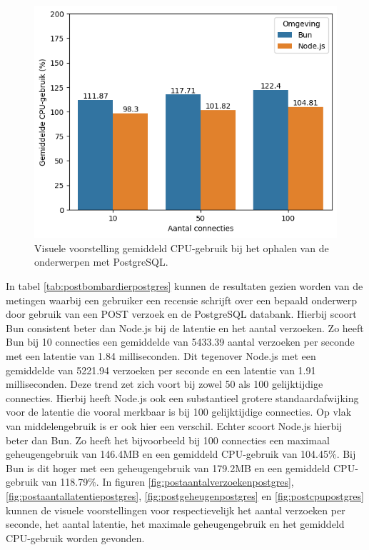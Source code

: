   \begin{figure}[H]
    \centering
    \includegraphics[width=0.7\columnwidth]{graphics/GetPostgresCpu.png}
    \caption[CPU-gebruik GET verzoek met PostgreSQL]{\label{fig:getcpupostgres}Visuele voorstelling gemiddeld CPU-gebruik bij het ophalen van de onderwerpen met PostgreSQL.}
  \end{figure}

In tabel \ref{tab:postbombardierpostgres} kunnen de resultaten gezien worden van de metingen waarbij 
een gebruiker een recensie schrijft over een bepaald onderwerp door gebruik van een POST verzoek en de PostgreSQL databank.
Hierbij scoort Bun consistent beter dan Node.js bij de latentie en het aantal verzoeken.
Zo heeft Bun bij 10 connecties een gemiddelde van 5433.39 aantal verzoeken per seconde met een latentie van 1.84 milliseconden. 
Dit tegenover Node.js met een gemiddelde van 5221.94 verzoeken per seconde en een latentie van 1.91 milliseconden.
Deze trend zet zich voort bij zowel 50 als 100 gelijktijdige connecties.
Hierbij heeft Node.js ook een substantieel grotere standaardafwijking voor de latentie die vooral merkbaar is bij 100 gelijktijdige connecties.
Op vlak van middelengebruik is er ook hier een verschil. Echter scoort Node.js hierbij beter dan Bun.
Zo heeft het bijvoorbeeld bij 100 connecties een maximaal geheugengebruik van 146.4MB en een gemiddeld CPU-gebruik van 104.45\%.
Bij Bun is dit hoger met een geheugengebruik van 179.2MB en een gemiddeld CPU-gebruik van 118.79\%.
In figuren \ref{fig:postaantalverzoekenpostgres}, \ref{fig:postaantallatentiepostgres}, \ref{fig:postgeheugenpostgres} en \ref{fig:postcpupostgres} kunnen de visuele voorstellingen 
voor respectievelijk het aantal verzoeken per seconde, het aantal latentie, het maximale geheugengebruik en het gemiddeld CPU-gebruik worden gevonden.

